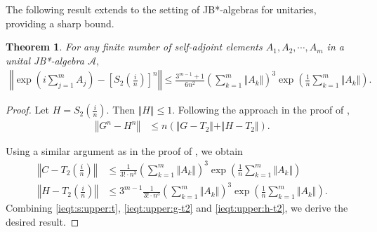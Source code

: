 \documentclass{article}
\theoremstyle{plain} %
\newtheorem{thm}{Theorem}[section]
\numberwithin{equation}{section}
\begin{document}

The following result extends \cite[Theorem 3.3]{chehade:wang:wang:2024:suzuki} to the setting of JB*-algebras for unitaries, providing a sharp bound.  
   
\begin{thm}\label{thm:Trotter:second:JB*}
	For any finite number of self-adjoint elements $A_1, A_2,\cdots, A_m$ in a unital JB*-algebra $\mathcal{A},$
	\begin{align*}
	\left\Vert \exp \left(i \sum_{j=1}^m A_j\right)-\left[S_2\left(\frac{i}{n}\right)\right]^n\right \Vert	
		\leq
		\frac{3^{m-1}+1}{6n^2}\left( \sum_{k=1}^m \Vert A_k\Vert\right)^3\exp\left(\frac{1}{n}\sum_{k=1}^m \Vert A_k\Vert\right).
  \end{align*}
\end{thm}
\begin{proof}
	Let $\displaystyle 
		H=S_2\left(\frac{i}{n}\right).$ Then $\displaystyle \Vert H\Vert\leq 1.$
	 Following the approach in the proof of ,
	\begin{align}
	\left\Vert G^n-H^n \right\Vert
        & \leq n(\Vert G-T_2\Vert + \Vert H-T_2\Vert) \label{ieqt:s:upper:t}.
	\end{align}
	
Using a similar argument as in the proof of , we obtain
\begin{align}
		\left\Vert C-T_2\left(\frac{i}{n}\right)\right\Vert
		&\leq \frac{1}{3!\cdot n^3}\left(\sum_{k=1}^m \Vert A_k\Vert \right)^3\exp \left(\frac{1}{n}\sum_{k=1}^m \Vert A_k\Vert \right) \label{ieqt:upper:g-t2} \\
		\left\Vert H-T_2\left(\frac{i}{n}\right)\right\Vert 
		&\leq 3^{m-1} \frac{1}{3!\cdot n^3}\left(\sum_{k=1}^m \Vert A_k\Vert \right)^3\exp \left(\frac{1}{n}\sum_{k=1}^m \Vert A_k\Vert \right)\label{ieqt:upper:h-t2}.
	\end{align}	
	Combining \cref{ieqt:s:upper:t}, \cref{ieqt:upper:g-t2} and \cref{ieqt:upper:h-t2}, we derive the desired result.
	\end{proof}
\end{document}
